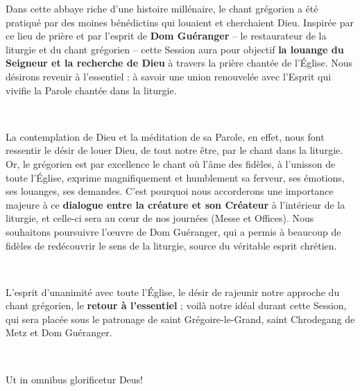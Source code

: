 \documentclass[10pt, twoside, french]{book}
\begin{document}
\thispagestyle{empty}
\null\newpage

\thispagestyle{empty}
\null\newpage


\vspace{5mm}


\vspace{5mm}

Dans cette abbaye riche d’une histoire millénaire, le chant grégorien a été pratiqué par des moines bénédictins qui louaient et cherchaient Dieu. Inspirée par ce lieu de prière et par l’esprit de \textbf{Dom Guéranger} – le restaurateur de la liturgie et du chant grégorien – cette Session aura pour objectif \textbf{la louange du Seigneur et la recherche de Dieu} à travers la prière chantée de l’Église. Nous désirons revenir à l’essentiel : à savoir une union renouvelée avec l’Esprit qui vivifie la Parole chantée dans la liturgie.

~


La contemplation de Dieu et la méditation de sa Parole, en effet, nous font ressentir le désir de louer Dieu, de tout notre être, par le chant dans la liturgie. Or, le grégorien est par excellence le chant où l’âme des fidèles, à l’unisson de toute l’Église, exprime magnifiquement et humblement sa ferveur, ses émotions, ses louanges, ses demandes. C’est pourquoi nous accorderons une importance majeure à ce \textbf{dialogue entre la créature et son Créateur} à l’intérieur de la liturgie, et celle-ci sera au cœur de nos journées (Messe et Offices). Nous souhaitons poursuivre l’œuvre de Dom Guéranger, qui a permis à beaucoup de fidèles de redécouvrir le sens de la liturgie, source du véritable esprit chrétien.

~

L’esprit d’unanimité avec toute l’Église, le désir de rajeunir notre approche du chant grégorien, le \textbf{retour à l’essentiel} ; voilà notre idéal durant cette Session, qui sera placée sous le patronage de saint Grégoire-le-Grand, saint Chrodegang de Metz et Dom Guéranger.

~


\hfill Ut in omnibus glorificetur Deus!

\cleardoublepage

\end{document}
